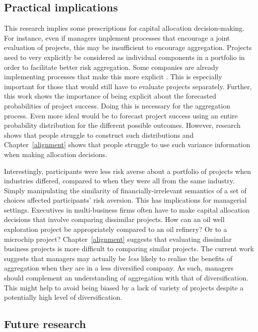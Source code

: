 \documentclass[a4paper, nobind, dvipsnames]{templates/ociamthesis}
\theoremstyle{definition}
\theoremstyle{definition}
\theoremstyle{definition}
\theoremstyle{definition}
\theoremstyle{remark}
\begin{document}
\subsection{Practical implications}

This research implies some prescriptions for capital allocation decision-making.
For instance, even if managers implement processes that encourage a joint
evaluation of projects, this may be insufficient to encourage aggregation.
Projects need to very explicitly be considered as individual components in a
portfolio in order to facilitate better risk aggregation. Some companies are
already implementing processes that make this more explicit \autocite{lovallo2020}. This
is especially important for those that would still have to evaluate projects
separately. Further, this work shows the importance of being explicit about the
forecasted probabilities of project success. Doing this is necessary for the
aggregation process. Even more ideal would be to forecast project success using
an entire probability distribution for the different possible outcomes. However,
research shows that people struggle to construct such distributions \autocites[e.g.,][]{alpert1982,schaefer1973,staelvonholstein1971,tversky1974} and
Chapter~\ref{alignment} shows that people struggle to use such variance
information when making allocation decisions.

Interestingly, participants were less risk averse about a portfolio of projects
when industries differed, compared to when they were all from the same industry.
Simply manipulating the similarity of financially-irrelevant semantics of a set
of choices affected participants' risk aversion. This has implications for
managerial settings. Executives in multi-business firms often have to make
capital allocation decisions that involve comparing dissimilar projects. How can
an oil well exploration project be appropriately compared to an oil refinery? Or
to a microchip project? Chapter~\ref{alignment} suggests that evaluating
dissimilar business projects is more difficult to comparing similar projects.
The current work suggests that managers may actually be \emph{less} likely to realise
the benefits of aggregation when they are in a less diversified company. As
such, managers should complement an understanding of aggregation with that of
diversification. This might help to avoid being biased by a lack of variety of
projects despite a potentially high level of diversification.

\subsection{Future research}
\end{document}

